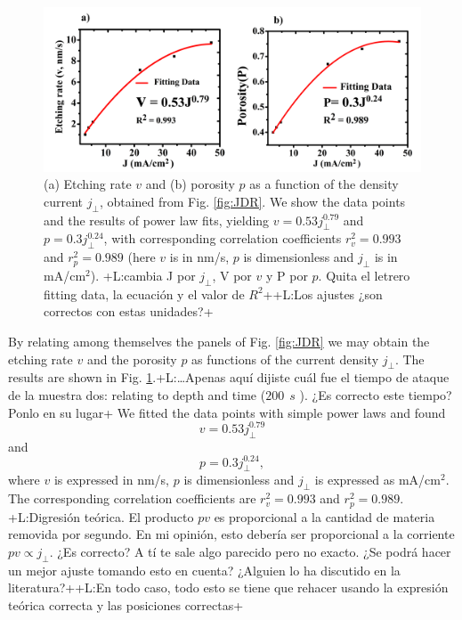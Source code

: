\documentclass{article}
\newcommand{\notaL}[1]{{\color{blue}+L:#1+}}
\begin{document}
\begin{figure}
  \centering
  \includegraphics[width=\textwidth]{Images/grinJD31}
  \caption{(a) Etching rate $v$ and (b) porosity $p$ as a function of the
    density current $j_\perp$, obtained from Fig. \ref{fig:JDR}. We
    show the data points and the results of power
    law fits, yielding $v=0.53j_\perp^{0.79}$ and
    $p=0.3j_\perp^0.24$, with corresponding correlation coefficients
      $r_v^2=0.993$ and $r_p^2=0.989$ (here $v$ is in nm/s, $p$ is
      dimensionless and $j_\perp$ is in mA/cm$^2$). \notaL{cambia J por $j_\perp$, V por $v$ y P
      por $p$. Quita el letrero fitting data, la ecuación y el valor
      de $R^2$}\notaL{Los ajustes ¿son correctos con estas unidades?}}
  \label{fig:Indr1}
\end{figure}
By relating among themselves the panels of Fig. \ref{fig:JDR} we
may obtain the etching rate $v$ and the porosity $p$ as
functions of the current density $j_\perp$. The results are shown in
Fig. \ref{fig:Indr1}.\notaL{\ldots Apenas aquí dijiste cuál fue el
  tiempo de ataque de la muestra dos: relating to depth and time ($
  200 \ \ s $ ). ¿Es correcto este tiempo? Ponlo en su lugar}
We fitted the data points with simple power laws and found
\begin{equation}
  \label{eq:etch}
  v=0.53j_\perp^{0.79}
\end{equation}
and
\begin{equation}
  \label{eq:poros}
  p=0.3j_\perp^{0.24},
\end{equation}
where $v$ is
expressed in nm/s, $p$ is dimensionless and $j_\perp$ is expressed as
mA/cm$^2$. The corresponding correlation coefficients are $r_v^2=0.993$
and $r_p^2=0.989$. \notaL{Digresión teórica. El producto $pv$ es
  proporcional a la cantidad de materia removida por segundo. En mi
  opinión, esto debería ser proporcional a la corriente $pv\propto
  j_\perp$. ¿Es correcto? A tí te sale algo parecido pero no
  exacto. ¿Se podrá hacer un mejor ajuste tomando esto en cuenta?
  ¿Alguien lo ha discutido en la literatura?}\notaL{En todo caso, todo
  esto se tiene que rehacer usando la expresión teórica correcta y las
  posiciones correctas}
\end{document}
